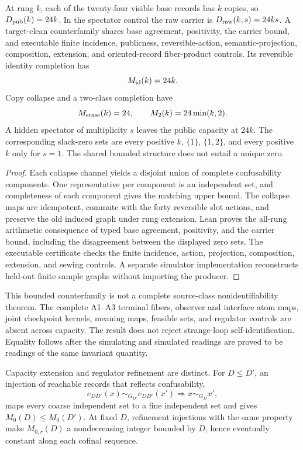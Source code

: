 \begin{theorem}
\label{thm:capacity-continuation-nonidentifiability}
At rung \(k\), each of the twenty-four visible base records has \(k\) copies,
so \(D_{\rm pub}(k)=24k\). In the spectator control the raw carrier is
\(D_{\rm raw}(k,s)=24ks\). A target-clean counterfamily shares base agreement,
positivity, the carrier bound, and executable finite incidence, publicness,
reversible-action, semantic-projection, composition, extension, and
oriented-record fiber-product controls. Its reversible identity completion has
\[
M_{\rm id}(k)=24k.
\]
Copy collapse and a two-class completion have
\[
M_{\rm erase}(k)=24,
\qquad
M_2(k)=24\min(k,2).
\]
A hidden spectator of multiplicity \(s\) leaves the public capacity at
\(24k\). The corresponding
slack-zero sets are every positive \(k\), \(\{1\}\), \(\{1,2\}\), and every
positive \(k\) only for \(s=1\). The shared bounded structure does not entail
a unique zero.
\end{theorem}

\begin{proof}
Each collapse channel yields a disjoint union of complete confusability
components. One representative per component is an independent set, and
completeness of each component gives the matching upper bound. The collapse
maps are idempotent, commute with the forty reversible slot actions, and
preserve the old induced graph under rung extension. Lean proves the all-rung
arithmetic consequence of typed base agreement, positivity, and the carrier
bound, including the disagreement between the displayed zero sets. The
executable certificate
checks the finite incidence, action, projection, composition, extension, and
sewing controls. A separate simulator implementation reconstructs held-out
finite sample graphs without importing the producer.
\end{proof}

This bounded counterfamily is not a complete source-class nonidentifiability
theorem. The complete A1--A3 terminal fibers, observer and interface atom
maps, joint checkpoint kernels, meaning maps, feasible sets, and regulator
controls are absent across capacity. The result does not reject strange-loop
self-identification.
Equality follows after the simulating and simulated readings are proved to be
readings of the same invariant quantity.

Capacity extension and regulator refinement are distinct. For
\(D\le D'\), an injection of reachable records that reflects confusability,
\[
e_{DD'}(x)\sim_{G_{D'}}e_{DD'}(x')
\Longrightarrow x\sim_{G_D}x',
\]
maps every coarse independent set to a fine independent set and gives
\(M_0(D)\le M_0(D')\). At fixed \(D\), refinement injections with the same
property make \(M_{0,r}(D)\) a nondecreasing integer bounded by \(D\), hence
eventually constant along each cofinal sequence.

